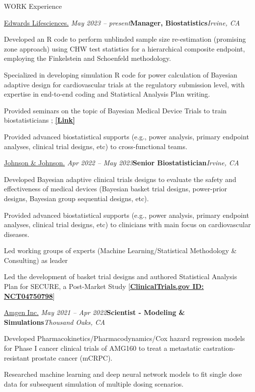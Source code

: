 \documentclass[
	11pt, %
]{resume} %
\begin{document}
\begin{rSection}{WORK Experience}

\begin{rSubsection}{
\href{https://www.edwards.com/}{Edwards Lifesciences.}
}{\em May 2023 -- present}{\textbf{Manager, Biostatistics}}{\em Irvine, CA}
\item Developed an R code to perform unblinded sample size re-estimation (promising zone approach) using CHW test statistics for a hierarchical composite endpoint, employing the Finkelstein and Schoenfeld methodology.
\item Specialized in developing simulation R code for power calculation of Bayesian adaptive design for cardiovascular trials at the regulatory submission level, with expertise in end-to-end coding and Statistical Analysis Plan writing.
\item Provided seminars on the topic of Bayesian Medical Device Trials to train biostatisticians ; \href{https://drive.google.com/file/d/1pHxwp4T9Nq2EKNrlxqzy1VxmxcZAERH-/view}{\underline{\textbf{[Link]}}}
\item Provided advanced biostatistical supports (e.g., power analysis, primary endpoint analyses, clinical trial designs, etc) to cross-functional teams.
\end{rSubsection}


\begin{rSubsection}{
\href{https://www.jnjmedtech.com/en-US}{Johnson \& Johnson.}
}{\em Apr 2022 -- May 2023}{\textbf{Senior Biostatistician}}{\em Irvine, CA}
\item Developed Bayesian adaptive clinical trials designs to evaluate the safety and effectiveness of medical devices (Bayesian basket trial designs, power-prior designs, Bayesian group sequential designs, etc).
\item Provided advanced biostatistical supports (e.g., power analysis, primary endpoint analyses, clinical trial designs, etc) to clinicians with main focus on cardiovascular diseases.
\item Led working groups of experts (Machine Learning/Statistical Methodology \& Consulting) as leader
\item Led the development of basket trial designs and authored Statistical Analysis Plan for SECURE, a Post-Market Study [\href{https://clinicaltrials.gov/ct2/show/NCT04750798}{\underline{\textbf{ClinicalTrials.gov ID: NCT04750798}}}]
\end{rSubsection}


\begin{rSubsection}{
\href{https://www.amgen.com/}{Amgen Inc.}
}{\em May 2021 -- Apr 2022}{\textbf{Scientist - Modeling \& Simulations}}{\em Thousand Oaks, CA}
\item 
Developed Pharmacokinetics/Pharmacodynamics/Cox hazard regression models for Phase I cancer clinical trials of AMG160 to treat a metastatic castration-resistant prostate cancer (mCRPC).
\item 
Researched machine learning and deep neural network models to fit single dose data for subsequent simulation of multiple dosing scenarios. 
\end{rSubsection}


\end{rSection}
\end{document}
